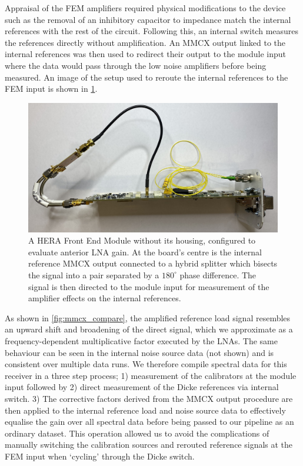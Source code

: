 Appraisal of the FEM amplifiers required physical modifications to the device such as the removal of an inhibitory capacitor to impedance match the internal references with the rest of the circuit. Following this, an internal switch measures the references directly without amplification. An MMCX output linked to the internal references was then used to redirect their output to the module input where the data would pass through the low noise amplifiers before being measured. An image of the setup used to reroute the internal references to the FEM input is shown in \cref{fig:hera_reroute}.
\begin{figure}
    \centering
    \includegraphics[width=.8\textwidth]{hera_reroute}
    \caption{A HERA Front End Module without its housing, configured to evaluate anterior LNA gain. At the board's centre is the internal reference MMCX output connected to a hybrid splitter which bisects the signal into a pair separated by a $180^{\circ}$ phase difference. The signal is then directed to the module input for measurement of the amplifier effects on the internal references.}
    \label{fig:hera_reroute}
\end{figure}
As shown in \cref{fig:mmcx_compare}, the amplified reference load signal resembles an upward shift and broadening of the direct signal, which we approximate as a frequency-dependent multiplicative factor executed by the LNAs. The same behaviour can be seen in the internal noise source data (not shown) and is consistent over multiple data runs. We therefore compile spectral data for this receiver in a three step process; 1) measurement of the calibrators at the module input followed by 2) direct measurement of the Dicke references via internal switch. 3) The corrective factors derived from the MMCX output procedure are then applied to the internal reference load and noise source data to effectively equalise the gain over all spectral data before being passed to our pipeline as an ordinary dataset. This operation allowed us to avoid the complications of manually switching the calibration sources and rerouted reference signals at the FEM input when ‘cycling’ through the Dicke switch.
